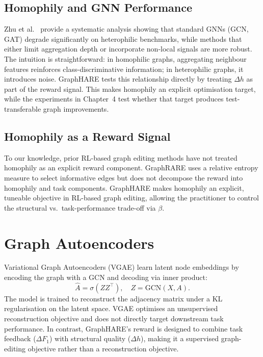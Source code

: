 \subsection{Homophily and GNN Performance}

Zhu et al.~\cite{zhu2020homophily} provide a systematic analysis showing that standard
GNNs (GCN, GAT) degrade significantly on heterophilic benchmarks, while methods that
either limit aggregation depth or incorporate non-local signals are more robust. The
intuition is straightforward: in homophilic graphs, aggregating neighbour features
reinforces class-discriminative information; in heterophilic graphs, it introduces noise.
GraphHARE tests this relationship directly by treating $\Delta h$ as part of the reward
signal. This makes homophily an explicit optimisation target, while the experiments in
Chapter~4 test whether that target produces test-transferable graph improvements.

\subsection{Homophily as a Reward Signal}

To our knowledge, prior RL-based graph editing methods have not treated homophily as an
explicit reward component. GraphRARE \cite{graphrare2024} uses a relative entropy measure
to select informative edges but does not decompose the reward into homophily and task
components. GraphHARE makes homophily an explicit, tuneable objective in RL-based graph
editing, allowing the practitioner to control the structural vs.\ task-performance
trade-off via $\beta$.

\section{Graph Autoencoders}

Variational Graph Autoencoders (VGAE) \cite{kipf2016vgae} learn latent node embeddings
by encoding the graph with a GCN and decoding via inner product:
\begin{equation}
    \hat{A} = \sigma(ZZ^\top), \quad Z = \text{GCN}(X, A).
\end{equation}
The model is trained to reconstruct the adjacency matrix under a KL regularisation on
the latent space. VGAE optimises an unsupervised reconstruction objective and does not
directly target downstream task performance. In contrast, GraphHARE's reward is designed
to combine task feedback ($\Delta F_1$) with structural quality ($\Delta h$), making it a
supervised graph-editing objective rather than a reconstruction objective.

